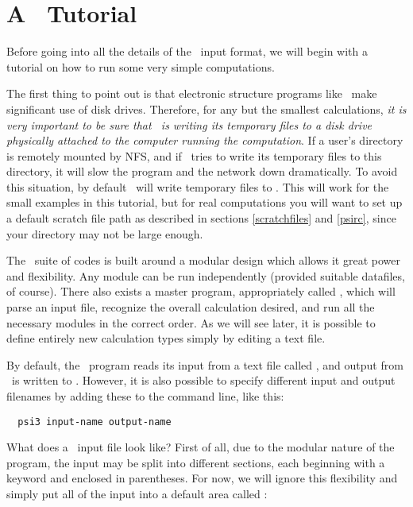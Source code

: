 \section{A \PSIthree\ Tutorial} \label{tutorial}

Before going into all the details of the \PSIthree\ input format, 
we will begin with a tutorial on how to run some very simple 
computations.

The first thing to point out is that electronic structure programs
like \PSIthree\ make significant use of disk drives.  Therefore, 
for any but the smallest calculations, {\em it is very important 
to be sure that \PSIthree\ is writing its temporary files to a 
disk drive physically attached to the computer running the computation}.
If a user's directory is remotely mounted by NFS, and if \PSIthree\
tries to write its temporary files to this directory, it will slow 
the program and the network down dramatically.  To avoid this
situation, by default \PSIthree\ will write temporary files to 
.  This will work for the small examples in this tutorial,
but for real computations you will want to set up a default scratch
file path as described in sections \ref{scratchfiles} and \ref{psirc},
since your \file{/tmp} directory may not be large enough.

The \PSIthree\ suite of codes is built around a modular design which 
allows it great power and flexibility. Any module can be run 
independently (provided suitable datafiles, of course). There also exists a
master program, appropriately called \PSIdriver, which will parse 
an input file, recognize the overall calculation desired, 
and run all the necessary modules in the correct order.  As we will
see later, it is possible to define entirely new calculation types simply 
by editing a text file.

By default, the \PSIdriver\ program reads its input from a text file
called \inputdat, and output from \PSIthree\ is written to 
\outputdat.  However, it is also possible to specify different input
and output filenames by adding these to the command line, like this:
\begin{verbatim}
  psi3 input-name output-name
\end{verbatim}

What does a \PSIthree\ input file look like?  First of all, due to
the modular nature of the program, the input may be split into different
sections, each beginning with a keyword and enclosed in parentheses.
For now, we will ignore this flexibility and simply put all of the 
input into a default area called \keyword{psi}:

